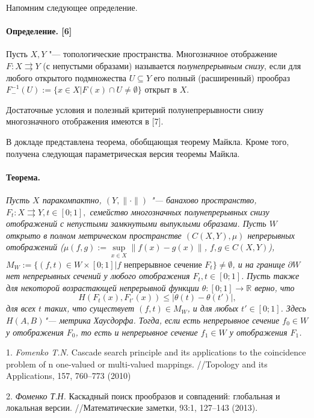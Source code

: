 Напомним следующее определение.

\paragraph{Определение. [6]} Пусть $X,Y$ "--- топологические пространства. Многозначное отображение $F: X\rightrightarrows Y$ (с непустыми образами) называется {\it полунепрерывным снизу}, если для любого открытого подмножества  $U\subseteq Y$ его полный (расширенный) прообраз $F^{-1}_{-}(U):=\{x\in X | F(x)\cap U\ne \emptyset\}$ открыт в $X$.

Достаточные условия и полезный критерий полунепрерывности снизу многозначного отображения имеются в  [7].

В докладе представлена теорема, обобщающая теорему Майкла. Кроме того, получена следующая параметрическая версия теоремы Майкла.

\paragraph{Теорема.}
{\it Пусть $X$ паракомпактно, $(Y,\|\cdot \|)$ "--- банахово пространство, $F_{t}: X\rightrightarrows Y, t\in [0;1],$ семейство многозначных полунепрерывных снизу отображений с непустыми замкнутыми выпуклыми образами. Пусть $W$  открыто в полном метрическом пространстве $(C(X,Y),\mu)$ непрерывных отображений ($\mu(f,g):=\mathop{\sup}\limits_{x\in X}\|f(x)-g(x)\|$, $f,g\in C(X,Y)$), $M_{W}:=\{(f,t)\in W\times [0;1] | f \mbox{ непрерывное сечение } F_{t}\}\ne \emptyset$, и на границе $\partial W$ нет непрерывных сечений у любого отображения $F_{t}, t\in [0;1]$. Пусть также для некоторой возрастающей непрерывной функции $\theta: [0;1]\to \mathbb R$ верно, что
$$
H(F_{t}(x),F_{t'}(x))\le|\theta(t)-\theta(t')|,
$$
для всех $t$ таких, что существует $(f,t)\in M_{W}$, и для любых $t'\in [0;1]$. Здесь $H(A,B)$"--- метрика Хаусдорфа. Тогда, если есть непрерывное сечение $f_{0}\in W$ у отображения $F_{0}$, то есть и непрерывное сечение $f_{1}\in W$ у отображения $F_{1}$.}

\litlist


1.
{\it Fomenko T.N.} Cascade search principle and its applica\-ti\-ons to the
coincidence problem of n one-valued or multi-valued mappings. //Topology and its Applications, 157, 760--773 (2010)


2.
{\it Фоменко Т.Н.} Каскадный поиск прообразов и совпадений: глобальная и
локальная версии. //Математические заметки,  93:1, 127--143 (2013).

